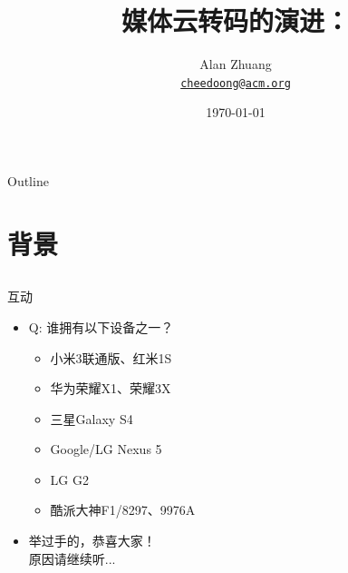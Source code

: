 \documentclass{beamer}
\title{媒体云转码的演进：\\\Small{MapReduce、DASH与稳定婚姻}}
\author{Alan Zhuang\\
\href{mailto:cheedoong@acm.org}{\nolinkurl{cheedoong@acm.org}}\\
}
\date{\today}
\begin{document}

\frame{\titlepage}

\section[Outline]{}
\begin{frame}{Outline}
\tableofcontents
\end{frame}

\section{背景}
\subsection{}
\begin{frame}{互动}
\begin{itemize}
\item Q: 谁拥有以下设备之一？
	\begin{itemize}
	\item 小米3联通版、红米1S
	\item 华为荣耀X1、荣耀3X
	\item 三星Galaxy S4
	\item Google/LG Nexus 5
	\item LG G2
	\item 酷派大神F1/8297、9976A
	\end{itemize}
\item  举过手的，恭喜大家！\\
原因请继续听...
\end{itemize}
\end{frame}
\end{document}

